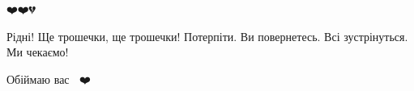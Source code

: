  
 
 
 
 

\qqSecCmt


❤️❤️💔

Рідні! Ще трошечки, ще трошечки! Потерпіти. Ви повернетесь. Всі зустрінуться.
Ми чекаємо!

Обіймаю вас 💙💛❤️

